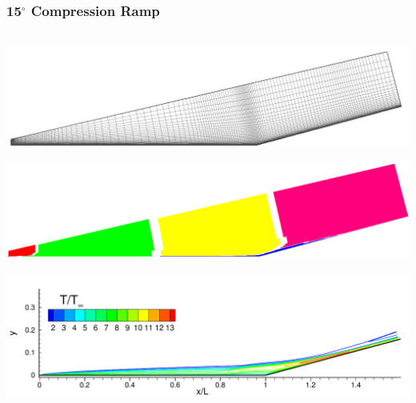 \documentclass[compress,11pt]{beamer}
\begin{document}
\frame
{
  \frametitle{\scriptsize 15$^\circ$ Compression Ramp}
  \vspace{-2.4em}
  \begin{columns}[t]
      \begin{center}
	\includegraphics[width=\textwidth]{figures/holden_ramp/grid}
	
	\includegraphics[width=\textwidth]{figures/holden_ramp/partitioned}
	
	\includegraphics[width=\textwidth]{figures/holden_ramp/T}
	

\end{center}
\end{columns}}
\end{document}
